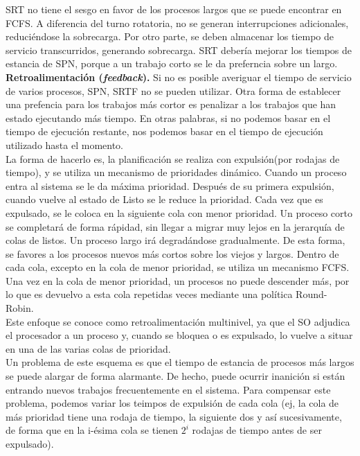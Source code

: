 \documentclass{article}
\begin{document}
				 SRT no tiene el sesgo en favor de los procesos largos que se puede encontrar en FCFS. A diferencia del turno rotatoria, no se generan interrupciones adicionales, reduciéndose la sobrecarga. Por otro parte, se deben almacenar los tiempo de servicio transcurridos, generando sobrecarga. SRT debería mejorar los tiempos de estancia de SPN, porque a un trabajo corto se le da preferncia sobre un largo. \\
				 
				 \textbf{Retroalimentación (\textit{feedback}).} Si no es posible averiguar el tiempo de servicio de varios procesos, SPN, SRTF no se pueden utilizar. Otra forma de establecer una prefencia para los trabajos más cortor es penalizar a los trabajos que han estado ejecutando más tiempo. En otras palabras, si no podemos basar en el tiempo de ejecución restante, nos podemos basar en el tiempo de ejecución utilizado hasta el momento. \\
				 
				 La forma de hacerlo es, la planificación se realiza con expulsión(por rodajas de tiempo), y se utiliza un mecanismo de prioridades dinámico. Cuando un proceso entra al sistema se le da máxima prioridad. Después de su primera expulsión, cuando vuelve al estado de Listo se le reduce la prioridad. Cada vez que es expulsado, se le coloca en la siguiente cola con menor prioridad. Un proceso corto se completará de forma rápidad, sin llegar a migrar muy lejos en la jerarquía de colas de listos. Un proceso largo irá degradándose gradualmente. De esta forma, se favores a los procesos nuevos más cortos sobre los viejos y largos. Dentro de cada cola, excepto en la cola de menor prioridad, se utiliza un mecanismo FCFS. Una vez en la cola de menor prioridad, un procesos no puede descender más, por lo que es devuelvo a esta cola repetidas veces mediante una política Round-Robin. \\
				 
				 Este enfoque se conoce como retroalimentación multinivel, ya que el SO adjudica el procesador a un proceso y, cuando se bloquea o es expulsado, lo vuelve a situar en una de las varias colas de prioridad. \\
				 
				 Un problema de este esquema es que el tiempo de estancia de procesos más largos se puede alargar de forma alarmante. De hecho, puede ocurrir inanición si están entrando nuevos trabajos frecuentemente en el sistema. Para compensar este problema, podemos variar los teimpos de expulsión de cada cola (ej, la cola de más prioridad tiene una rodaja de tiempo, la siguiente dos y así sucesivamente, de forma que en la i-ésima cola se tienen $2^i$ rodajas de tiempo antes de ser expulsado). \\
				 
\end{document}
